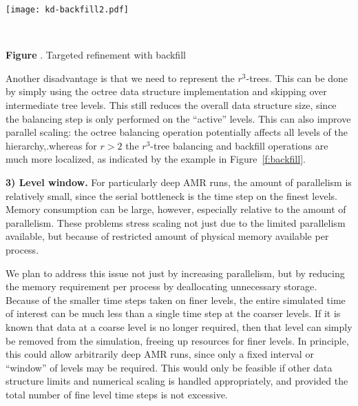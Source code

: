 \documentclass[11pt,letterpaper]{article}
\newcounter{figctr}
\newcommand{\FIGURE}[3]{
\noindent
\parbox{\textwidth}{
\begin{center}
#3
\end{center}%
\ \nolinebreak%
\refstepcounter{figctr}%
\begin{center}%
\begin{minipage}{7.0in}
\textbf{Figure \thefigctr}. #1
\end{minipage}
\end{center}
\label{#2}
}}
\begin{document}

 \FIGURE{Targeted refinement with backfill}{f:backfill}{
 \begin{minipage}{6.15in}
  \begin{center}
 \texttt{[image: kd-backfill2.pdf]}
  \end{center}
 \end{minipage}}

Another disadvantage is that we need to represent the $r^3$-trees.
This can be done by simply using the octree data structure
implementation and skipping over intermediate tree levels.  This still
reduces the overall data structure size, since the balancing step is
only performed on the ``active'' levels.  This can also improve
parallel scaling: the octree balancing operation potentially affects
all levels of the hierarchy,.whereas for $r>2$ the $r^3$-tree
balancing and backfill operations are much more localized, as
indicated by the example in Figure~\ref{f:backfill}.


\textbf{3) Level window.}  
For particularly deep AMR runs, the
amount of parallelism is relatively small, since the serial bottleneck
is the time step on the finest levels.  Memory consumption can be
large, however, especially relative to the amount of parallelism.
These problems stress scaling not just due to the limited parallelism
available, but because of restricted amount of physical memory
available per process.

We plan to address this issue not just by increasing parallelism, but
by reducing the memory requirement per process by deallocating
unnecessary storage.  Because of the smaller time steps taken on finer
levels, the entire simulated time of interest can be much less than a
single time step at the coarser levels.  If it is known that data at a
coarse level is no longer required, then that level can simply be
removed from the simulation, freeing up resources for finer levels.
In principle, this could allow arbitrarily deep AMR runs, since only a
fixed interval or ``window'' of levels may be required.  This would
only be feasible if other data structure limits and numerical scaling
is handled appropriately, and provided the total number of fine level
time steps is not excessive.
\end{document}
